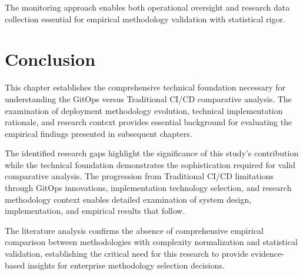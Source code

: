 The monitoring approach enables both operational oversight and research data collection essential for empirical methodology validation with statistical rigor.

\section{Conclusion}

This chapter establishes the comprehensive technical foundation necessary for understanding the GitOps versus Traditional CI/CD comparative analysis. The examination of deployment methodology evolution, technical implementation rationale, and research context provides essential background for evaluating the empirical findings presented in subsequent chapters.

The identified research gaps highlight the significance of this study's contribution while the technical foundation demonstrates the sophistication required for valid comparative analysis. The progression from Traditional CI/CD limitations through GitOps innovations, implementation technology selection, and research methodology context enables detailed examination of system design, implementation, and empirical results that follow.

The literature analysis confirms the absence of comprehensive empirical comparison between methodologies with complexity normalization and statistical validation, establishing the critical need for this research to provide evidence-based insights for enterprise methodology selection decisions.